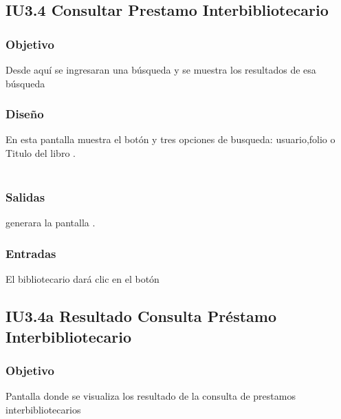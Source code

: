 \newpage
\subsection{IU3.4 Consultar Prestamo Interbibliotecario}

\subsubsection{Objetivo}
	Desde aquí se ingresaran una búsqueda y se muestra los resultados de esa búsqueda

\subsubsection{Diseño}
	En esta pantalla muestra el botón  y tres opciones de busqueda: usuario,folio o Titulo del libro .  \\\\


\subsubsection{Salidas}
	\begin{Citemize}
		\item generara la pantalla . 
	\end{Citemize}
	
\subsubsection{Entradas}
	\begin{Citemize}
		\item El bibliotecario dará clic en el botón \IUbutton{Buscar}
	\end{Citemize}




\subsection{IU3.4a Resultado Consulta Préstamo Interbibliotecario}

\subsubsection{Objetivo}
	Pantalla donde se visualiza los resultado de la consulta de prestamos interbibliotecarios

